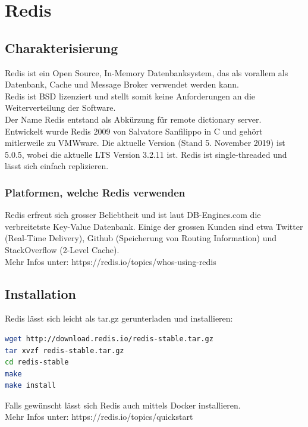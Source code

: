 \section{Redis}
\subsection{Charakterisierung}
Redis ist ein Open Source, In-Memory Datenbanksystem, das als vorallem als Datenbank, Cache und Message Broker verwendet werden kann.\\
Redis ist BSD lizenziert und stellt somit keine Anforderungen an die Weiterverteilung der Software.\\
Der Name Redis entstand als Abkürzung für remote dictionary server.\\
Entwickelt wurde Redis 2009 von Salvatore Sanfilippo in C und gehört mitlerweile zu VMWware. Die aktuelle Version (Stand 5. November 2019) ist 5.0.5, wobei die aktuelle LTS Version 3.2.11 ist.
Redis ist single-threaded und lässt sich einfach replizieren.

\subsubsection{Platformen, welche Redis verwenden}
Redis erfreut sich grosser Beliebtheit und ist laut DB-Engines.com die verbreitetste Key-Value Datenbank.
Einige der grossen Kunden sind etwa Twitter (Real-Time Delivery), Github (Speicherung von Routing Information) und StackOverflow (2-Level Cache).\\
Mehr Infos unter: https://redis.io/topics/whos-using-redis
\subsection{Installation}
Redis lässt sich leicht als tar.gz gerunterladen und installieren:
\begin{lstlisting}[language=bash]
wget http://download.redis.io/redis-stable.tar.gz
tar xvzf redis-stable.tar.gz
cd redis-stable
make
make install
\end{lstlisting}
Falls gewünscht lässt sich Redis auch mittels Docker installieren.\\
Mehr Infos unter: https://redis.io/topics/quickstart
\clearpage

